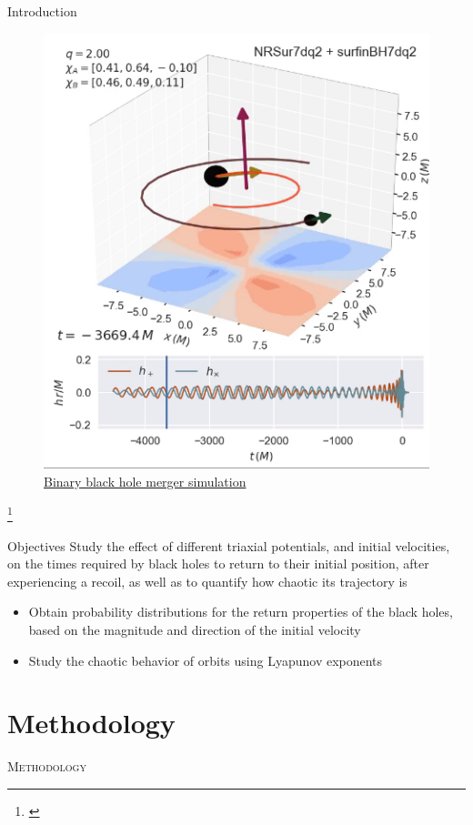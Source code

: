 \documentclass[handout]{beamer}
\newcommand\blfootnote[1]
{%
	\begingroup
	\renewcommand\thefootnote{}\footnote{#1}%
	\addtocounter{footnote}{-1}%
	\endgroup
}
\newcommand{\fcite}[1]{\blfootnote{\tiny\cite{#1}}}
\begin{document}
\begin{frame}{Introduction}
	\begin{figure}
		\centering
		\includegraphics[width=0.4\linewidth]{images/example}
		\caption{\href{run:/home/juan/Documents/TesisFisica/Slides/images/super_kick.mp4}{Binary black hole merger simulation}}
	\end{figure}
	
	\fcite{varma2018binary}
\end{frame}

\begin{frame}{Objectives}
	Study the effect of different triaxial potentials, and initial velocities, on the times required by black holes to return to their initial position, after experiencing a recoil, as well as to quantify how chaotic its trajectory is
	
	\begin{itemize}
		\item Obtain probability distributions for the return properties of the black holes, based on the magnitude and direction of the initial velocity
		\item Study the chaotic behavior of orbits using Lyapunov exponents
	\end{itemize}
\end{frame}

\section{Methodology}
\begin{frame}
	\centering
	\Huge
	\scshape
	Methodology
\end{frame}
\end{document}
